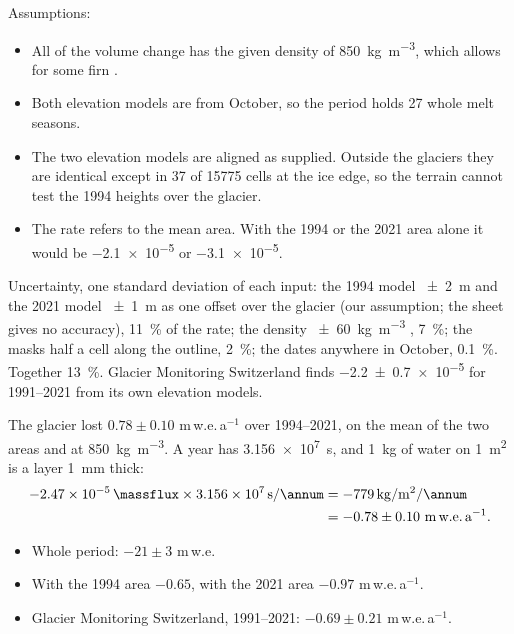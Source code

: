 \documentclass{scrartcl}
\begin{document}
\begin{reportpart}
{Assumptions:
\begin{itemize}
  \item All of the volume change has the given density of \qty{850}{\kilo\gram\per\cubic\metre},
    which allows for some firn \parencite{Huss2013}.
  \item Both elevation models are from October, so the period holds 27 whole melt seasons.
  \item The two elevation models are aligned as supplied. Outside the glaciers they are
    identical except in 37 of \num{15775} cells at the ice edge, so the terrain cannot test the
    1994 heights over the glacier.
  \item The rate refers to the mean area. With the 1994 or the 2021 area alone it would be
    \qty{-2.1e-5}{} or \qty{-3.1e-5}{\massflux}.
\end{itemize}

Uncertainty, one standard deviation of each input: the 1994 model \qty{\pm 2}{\metre} and the
2021 model \qty{\pm 1}{\metre} as one offset over the glacier (our assumption; the sheet gives
no accuracy), \qty{11}{\percent} of the rate; the density \qty{\pm 60}{\kilo\gram\per\cubic\metre}
\parencite{Huss2013}, \qty{7}{\percent}; the masks half a cell along the outline,
\qty{2}{\percent}; the dates anywhere in October, \qty{0.1}{\percent}. Together
\qty{13}{\percent}. Glacier Monitoring Switzerland finds \qty{-2.2 \pm 0.7 e-5}{\massflux} for
1991--2021 from its own elevation models.

\begin{converted}
The glacier lost $0.78 \pm 0.10$ m\,w.e.\,a$^{-1}$ over 1994--2021, on the mean of the two
areas and at \qty{850}{\kilo\gram\per\cubic\metre}. A year has \qty{3.156e7}{\second}, and
\qty{1}{\kilo\gram} of water on \qty{1}{\square\metre} is a layer \qty{1}{\milli\metre} thick:
\begin{align*}
  \qty{-2.47e-5}{\massflux} \times \qty{3.156e7}{\second\per\annum}
  &= \qty{-779}{\kilo\gram\per\square\metre\per\annum} \\
  &= -0.78 \pm 0.10\ \text{m\,w.e.\,a}^{-1} .
\end{align*}
\begin{itemize}
  \item Whole period: $-21 \pm 3$ m\,w.e.
  \item With the 1994 area $-0.65$, with the 2021 area $-0.97$ m\,w.e.\,a$^{-1}$.
  \item Glacier Monitoring Switzerland, 1991--2021: $-0.69 \pm 0.21$ m\,w.e.\,a$^{-1}$.
\end{itemize}
\end{converted}}


\end{reportpart}
\end{document}
